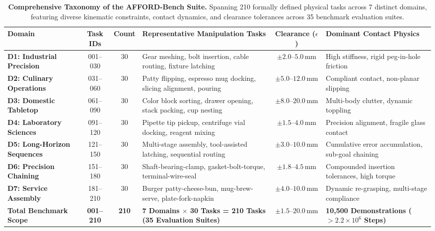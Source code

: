 \documentclass[conference]{IEEEtran}
\begin{document}
\begin{table}[t]
\centering
\caption{\textbf{Comprehensive Taxonomy of the AFFORD-Bench Suite.} Spanning 210 formally defined physical tasks across 7 distinct domains, featuring diverse kinematic constraints, contact dynamics, and clearance tolerances across 35 benchmark evaluation suites.}
\label{tab:domains}
\scriptsize
\setlength{\tabcolsep}{2.5pt}
\renewcommand{\arraystretch}{0.91}
\begin{tabularx}{\linewidth}{lccXcX}
\toprule
\textbf{Domain} & \textbf{Task IDs} & \textbf{Count} & \textbf{Representative Manipulation Tasks} & \textbf{Clearance ($\epsilon$)} & \textbf{Dominant Contact Physics} \\
\midrule
\textbf{D1: Industrial Precision} & 001--030 & 30 & Gear meshing, bolt insertion, cable routing, fixture latching & $\pm 2.0\text{--}5.0\,\text{mm}$ & High stiffness, rigid peg-in-hole friction \\
\textbf{D2: Culinary Operations} & 031--060 & 30 & Patty flipping, espresso mug docking, slicing alignment, pouring & $\pm 5.0\text{--}12.0\,\text{mm}$ & Compliant contact, non-planar slipping \\
\textbf{D3: Domestic Tabletop} & 061--090 & 30 & Color block sorting, drawer opening, stack packing, cup nesting & $\pm 8.0\text{--}20.0\,\text{mm}$ & Multi-body clutter, dynamic toppling \\
\textbf{D4: Laboratory Sciences} & 091--120 & 30 & Pipette tip pickup, centrifuge vial docking, reagent mixing & $\pm 1.5\text{--}4.0\,\text{mm}$ & Precision alignment, fragile glass contact \\
\textbf{D5: Long-Horizon Sequences} & 121--150 & 30 & Multi-stage assembly, tool-assisted latching, sequential routing & $\pm 3.0\text{--}10.0\,\text{mm}$ & Cumulative error accumulation, sub-goal chaining \\
\textbf{D6: Precision Chaining} & 151--180 & 30 & Shaft-bearing-clamp, gasket-bolt-torque, terminal-wire-seal & $\pm 1.8\text{--}4.5\,\text{mm}$ & Compounded insertion tolerances, high torque \\
\textbf{D7: Service Assembly} & 181--210 & 30 & Burger patty-cheese-bun, mug-brew-serve, plate-fork-napkin & $\pm 4.0\text{--}10.0\,\text{mm}$ & Dynamic re-grasping, multi-stage compliance \\
\midrule
\textbf{Total Benchmark Scope} & \textbf{001--210} & \textbf{210} & \textbf{7 Domains $\times$ 30 Tasks = 210 Tasks (35 Evaluation Suites)} & $\pm 1.5\text{--}20.0\,\text{mm}$ & \textbf{10,500 Demonstrations ($>2.2\times 10^6$ Steps)} \\
\bottomrule
\end{tabularx}
\end{table}
\end{document}
